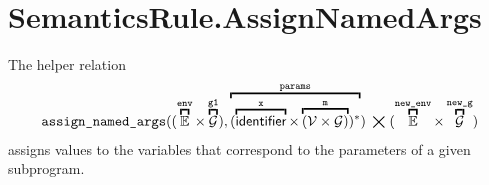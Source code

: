 \documentclass{book}
\newcommand\overname[2]{\overbracket{#1}^{#2}}
\newcommand\XGraphs[0]{\mathcal{G}}
\newcommand\vals[0]{\mathcal{V}}
\newcommand\aslrel[0]{\bigtimes}
\newcommand\aslsep[0]{\mathbf{,}}
\newcommand\assignnamedargs[0]{\texttt{assign\_named\_args}}
\newcommand\newenv[0]{\texttt{new\_env}}
\newcommand\env[0]{\texttt{env}}
\newcommand\newg[0]{\texttt{new\_g}}
\newcommand\vm[0]{\texttt{m}}
\newcommand\vgone[0]{\texttt{g1}}
\newcommand\params[0]{\texttt{params}}
\begin{document}

\section{SemanticsRule.AssignNamedArgs \label{sec:SemanticsRule.AssignNamedArgs}}
The helper relation
\[
  \begin{array}{c}
    \assignnamedargs((\overname{\envs}{\env}\times\overname{\XGraphs}{\vgone}) \aslsep
    \overname{(\overname{\identifier}{\vx}\times\overname{(\vals\times\XGraphs)}{\vm})^*}{\params}) \;\aslrel\;
    (\overname{\envs}{\newenv}\times\overname{\XGraphs}{\newg})
  \end{array}
\]
assigns values to the variables that correspond
to the parameters of a given subprogram.
\end{document}
